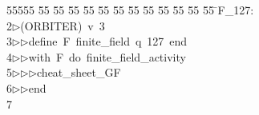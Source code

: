 %
%
\begin{tabbing}
55555 \= 55 \= 55 \= 55 \= 55 \= 55 \= 55 \= 55 \= 55 \= 55 \= 55 \= 55 \= 55 \= \>F\_127:\\[0pt]
2\>$\triangleright$\>(ORBITER)\ v\ 3\ \\[0pt]
3\>$\triangleright$\>$\triangleright$\>define\ F\ finite\_field\ q\ 127\ end\ \\[0pt]
4\>$\triangleright$\>$\triangleright$\>with\ F\ do\ finite\_field\_activity\ \\[0pt]
5\>$\triangleright$\>$\triangleright$\>$\triangleright$\>cheat\_sheet\_GF\ \\[0pt]
6\>$\triangleright$\>$\triangleright$\>end\\[0pt]
7\>\end{tabbing}
